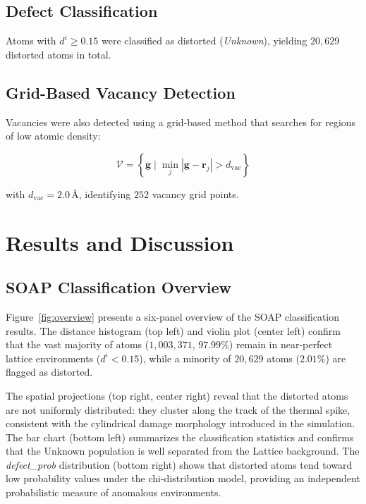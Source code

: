 \documentclass[11pt]{article}
\begin{document}
\subsection{Defect Classification}

Atoms with $d^i \geq 0.15$ were classified as distorted (\textit{Unknown}),
yielding $20{,}629$ distorted atoms in total.

\subsection{Grid-Based Vacancy Detection}

Vacancies were also detected using a grid-based method that searches for
regions of low atomic density:

\begin{equation}
\mathcal{V} = \left\{
  \mathbf{g} \;\Big|\;
  \min_{j} \left|\mathbf{g} - \mathbf{r}_j\right| > d_{\mathrm{vac}}
\right\}
\label{eq:grid}
\end{equation}

with $d_{\mathrm{vac}} = 2.0$\,\AA, identifying $252$ vacancy grid points.

\section{Results and Discussion}

\subsection{SOAP Classification Overview}

Figure~\ref{fig:overview} presents a six-panel overview of the SOAP
classification results. The distance histogram (top left) and violin plot
(center left) confirm that the vast majority of atoms ($1{,}003{,}371$,
$97.99\%$) remain in near-perfect lattice environments
($d^i < 0.15$), while a minority of $20{,}629$ atoms ($2.01\%$) are flagged
as distorted.

The spatial projections (top right, center right) reveal that the distorted
atoms are not uniformly distributed: they cluster along the track of the
thermal spike, consistent with the cylindrical damage morphology introduced
in the simulation. The bar chart (bottom left) summarizes the classification
statistics and confirms that the Unknown population is well separated from
the Lattice background. The \textit{defect\_prob} distribution (bottom right)
shows that distorted atoms tend toward low probability values under the
chi-distribution model, providing an independent probabilistic measure of
anomalous environments.
\end{document}
